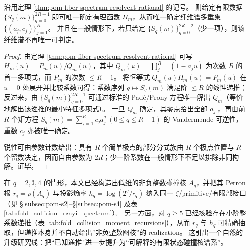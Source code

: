\begin{theorem}\label{thm:pom-fiber-spectrum-finite-reconstruction-sharp}
沿用定理 \ref{thm:pom-fiber-spectrum-resolvent-rational} 的记号。
则给定有限数据
\(
\{S_q(m)\}_{q=0}^{2R-1}
\)
即可唯一确定有理函数 \(H_m\)，从而唯一确定纤维谱多重集 \(\{(a_j,c_j)\}_{j=1}^{R}\)。
并且在一般情形下，若只给定 \(\{S_q(m)\}_{q=0}^{2R-2}\)（少一项），则该纤维谱不再唯一可判定。
\end{theorem}
\begin{proof}
由定理 \ref{thm:pom-fiber-spectrum-resolvent-rational} 可写 \(H_m(u)=P_m(u)/Q_m(u)\)，其中
\(
Q_m(u)=\prod_{j=1}^{R}(1-a_j u)
\)
为次数 \(R\) 的首一多项式，而 \(P_m\) 的次数 \(\le R-1\)。
将恒等式 \(Q_m(u)H_m(u)=P_m(u)\) 在 \(u=0\) 处展开并比较系数可得：系数序列 \(q\mapsto S_q(m)\) 满足阶 \(\le R\) 的线性递推；反过来，由 \(\{S_q(m)\}_{q=0}^{2R-1}\) 可通过标准的 Pad\'e/Prony 方程唯一解出 \(Q_m\)（等价地解出该递推的最小特征多项式）。
一旦 \(Q_m\) 确定，其零点给出全部 \(a_j\)；
再由前 \(R\) 个矩方程 \(S_q(m)=\sum_{j=1}^{R}c_j a_j^q\ (0\le q\le R-1)\) 的 Vandermonde 可逆性，重数 \(c_j\) 亦被唯一确定。
\par
锐性可由参数计数给出：具有 \(R\) 个简单极点的部分分式族由 \(R\) 个极点位置与 \(R\) 个留数决定，因而自由参数为 \(2R\)；少一阶系数在一般情形下不足以排除非同构解。证毕。
\end{proof}
\par
在 \(q=2,3,4\) 的情形，本文已经构造出低维的非负整数碰撞核 \(A_q\)，并把其 Perron 根 \(r_q=\rho(A_q)\) 与投影熵率 \(h_q=\log(2^q/r_q)\) 纳入同一 \(\zeta\)/primitive/有限部接口（见 \S\ref{subsec:pom-s2}--\S\ref{subsec:pom-s4} 及表 \ref{tab:fold_collision_renyi_spectrum}）。
另一方面，对 \(q\ge 5\) 已经核验存在小阶整系数递推（表 \ref{tab:fold_collision_moment_recursions}），从而 \(r_q\) 与 \(h_q\) 可精确抽取，但递推本身并不自动给出“非负整数图核”的 realization。
这引出一个自然的升级研究线：把“已知递推”进一步提升为“可解释的有限状态碰撞核谱系”。

